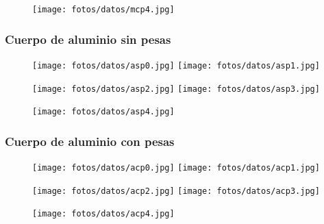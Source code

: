 \documentclass{article}
\begin{document}
\begin{figure}[h]
\centering
\texttt{[image: fotos/datos/mcp4.jpg]}\hfill
\end{figure}

\clearpage
\subsubsection{Cuerpo de aluminio sin pesas}

\begin{figure}[h]
\centering
\hspace*{-2cm}
\texttt{[image: fotos/datos/asp0.jpg]}\hfill
\texttt{[image: fotos/datos/asp1.jpg]}
\hspace*{-2cm}
\end{figure}

\begin{figure}[h]
\centering
\hspace*{-2cm}
\texttt{[image: fotos/datos/asp2.jpg]}\hfill
\texttt{[image: fotos/datos/asp3.jpg]}
\hspace*{-2cm}
\end{figure}

\begin{figure}[h]
\centering
\texttt{[image: fotos/datos/asp4.jpg]}\hfill
\end{figure}

\clearpage
\subsubsection{Cuerpo de aluminio con pesas}

\begin{figure}[h]
\centering
\hspace*{-2cm}
\texttt{[image: fotos/datos/acp0.jpg]}\hfill
\texttt{[image: fotos/datos/acp1.jpg]}
\hspace*{-2cm}
\end{figure}

\begin{figure}[h]
\centering
\hspace*{-2cm}
\texttt{[image: fotos/datos/acp2.jpg]}\hfill
\texttt{[image: fotos/datos/acp3.jpg]}
\hspace*{-2cm}
\end{figure}

\begin{figure}[h]
\centering
\texttt{[image: fotos/datos/acp4.jpg]}\hfill
\end{figure}
\end{document}
